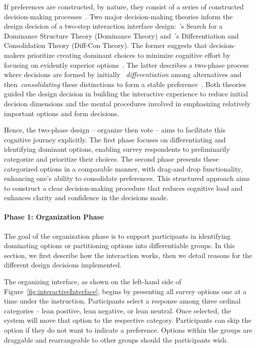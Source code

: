 If preferences are constructed, by nature, they consist of a series of constructed decision-making processes~\cite{lichtensteinConstructionPreference2006}. Two major decision-making theories inform the design decision of a two-step interaction interface design:~\textcite{montgomeryDecisionRulesSearch1983}'s Search for a Dominance Structure Theory (Dominance Theory) and~\textcite{svensonDifferentiationConsolidationTheory1992}'s Differentiation and Consolidation Theory (Diff-Con Theory). The former suggests that decision-makers prioritize creating dominant choices to minimize cognitive effort by focusing on evidently superior options~\cite{montgomeryDecisionRulesSearch1983}. The latter describes a two-phase process where decisions are formed by initially ~\textit{differentiation} among alternatives and then~\textit{consolidating} these distinctions to form a stable preference~\cite{svensonDifferentiationConsolidationTheory1992}. Both theories guided the design decision in building the interactive experience to reduce initial decision dimensions and the mental procedures involved in emphasizing relatively important options and form decisions.

Hence, the two-phase design -- organize then vote -- aims to facilitate this cognitive journey explicitly. The first phase focuses on differentiating and identifying dominant options, enabling survey respondents to preliminarily categorize and prioritize their choices. The second phase presents these categorized options in a comparable manner, with drag-and drop functionality, enhancing one's ability to consolidate preferences. This structured approach aims to construct a clear decision-making procedure that reduces cognitive load and enhances clarity and confidence in the decisions made.

\paragraph{Phase 1: Organization Phase}
The goal of the organization phase is to support participants in identifying dominating options or partitioning options into differentiable groups. In this section, we first describe how the interaction works, then we detail reasons for the different design decisions implemented.

The organizing interface, as shown on the left-hand side of Figure~\ref{fig:interactiveInterface}, begins by presenting all survey options one at a time under the instruction. Participants select a response among three ordinal categories -- lean positive, lean negative, or lean neutral. Once selected, the system will move that option to the respective category. Participants can skip the option if they do not want to indicate a preference. Options within the groups are draggable and rearrangeable to other groups should the participants wish.

